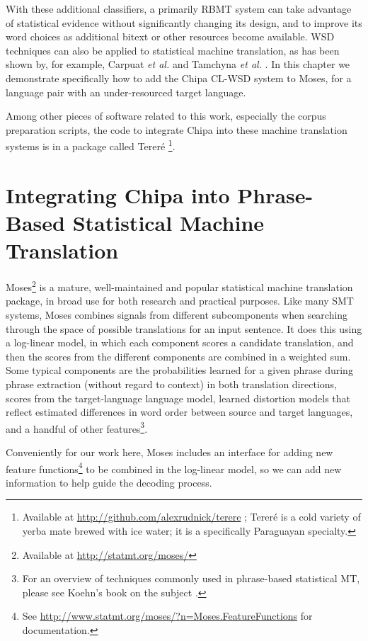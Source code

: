 With these additional classifiers, a primarily RBMT system can take advantage
of statistical evidence without significantly changing its design, and to
improve its word choices as additional bitext or other resources become
available.
WSD techniques can also be applied to statistical machine translation, as has
been shown by, for example, Carpuat \emph{et al.} \cite{carpuatpsd} and
Tamchyna \emph{et al.} \cite{tamchyna2014integrating}. In this chapter we
demonstrate specifically how to add the Chipa CL-WSD system to Moses, for a
language pair with an under-resourced target language.

Among other pieces of software related to this work, especially the corpus
preparation scripts, the code to integrate Chipa into these machine
translation systems is in a package called Tereré \footnote{Available at
\url{http://github.com/alexrudnick/terere} ; Tereré is a cold variety of yerba
mate brewed with ice water; it is a specifically Paraguayan specialty.}.

\section{Integrating Chipa into Phrase-Based Statistical Machine Translation}
Moses\footnote{Available at \url{http://statmt.org/moses/}} is a mature,
well-maintained and popular statistical machine translation package, in broad
use for both research and practical purposes.
Like many SMT systems, Moses combines signals from different subcomponents when
searching through the space of possible translations for an input sentence. It
does this using a log-linear model, in which each component scores a candidate
translation, and then the scores from the different components are combined in
a weighted sum. Some typical components are the probabilities learned for a
given phrase during phrase extraction (without regard to context) in both
translation directions, scores from the target-language language model, learned
distortion models that reflect estimated differences in word order between
source and target languages, and a handful of other features\footnote{For an
overview of techniques commonly used in phrase-based statistical MT, please see
Koehn's book on the subject \cite{koehn2010statistical}.}.

Conveniently for our work here, Moses includes an interface for adding new
feature functions\footnote{See
\url{http://www.statmt.org/moses/?n=Moses.FeatureFunctions} for documentation.}
to be combined in the log-linear model, so we can add new information to help
guide the decoding process.

